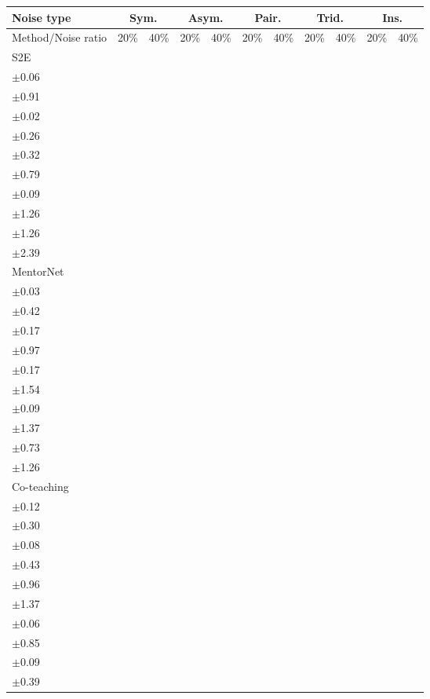 \documentclass[11pt]{article}
\begin{document}
\begin{table}[!t]
    \small
\centering
	\begin{tabular}{l |cc|cc|cc|cc|cc} 
		\Xhline{3\arrayrulewidth}	 	
		   Noise type &\multicolumn{2}{c|}{Sym.}&\multicolumn{2}{c|}{Asym.}&\multicolumn{2}{c|}{Pair.}&\multicolumn{2}{c|}{Trid.}&\multicolumn{2}{c}{Ins.}\\
			\hline
		   Method/Noise ratio&  20\% & 40\%& 20\% & 40\% &20\% & 40\%& 20\% & 40\% & 20\% & 40\%\\
			\hline
			S2E & \makecell{98.46\\ $\pm$\scriptsize{0.06}} & \makecell{95.62\\ $\pm$\scriptsize{0.91}} & \textbf{\makecell{99.05\\ $\pm$\scriptsize{0.02}}} & \textbf{\makecell{98.45\\ $\pm$\scriptsize{0.26}}} & \makecell{98.56\\ $\pm$\scriptsize{0.32}} & \makecell{94.22\\ $\pm$\scriptsize{0.79}} & \textbf{\makecell{99.02\\ $\pm$\scriptsize{0.09}}} & \makecell{97.23\\ $\pm$\scriptsize{1.26}} & \makecell{97.93\\ $\pm$\scriptsize{1.26}} & \makecell{94.02\\ $\pm$\scriptsize{2.39}}\\
			\hline
			MentorNet & \makecell{95.04\\ $\pm$\scriptsize{0.03}} & \makecell{92.08\\ $\pm$\scriptsize{0.42}} & \makecell{96.32\\ $\pm$\scriptsize{0.17}} & \makecell{90.86\\ $\pm$\scriptsize{0.97}} & \makecell{93.19\\ $\pm$\scriptsize{0.17}} & \makecell{90.93\\ $\pm$\scriptsize{1.54}} & \makecell{96.42\\ $\pm$\scriptsize{0.09}} & \makecell{93.28\\ $\pm$\scriptsize{1.37}} & \makecell{94.65\\ $\pm$\scriptsize{0.73}} & \makecell{90.11\\ $\pm$\scriptsize{1.26}}\\
			\hline
			Co-teaching & \makecell{97.53\\ $\pm$\scriptsize{0.12}} & \makecell{95.62\\ $\pm$\scriptsize{0.30}} & \makecell{98.25\\ $\pm$\scriptsize{0.08}} & \makecell{95.08\\ $\pm$\scriptsize{0.43}} & \makecell{96.05\\ $\pm$\scriptsize{0.96}} & \makecell{94.16\\ $\pm$\scriptsize{1.37}} & \makecell{98.05\\ $\pm$\scriptsize{0.06}} & \makecell{96.18\\ $\pm$\scriptsize{0.85}} & \makecell{97.96\\ $\pm$\scriptsize{0.09}} & \makecell{95.02\\ $\pm$\scriptsize{0.39}}\\

\end{tabular}
\end{table}
\end{document}

